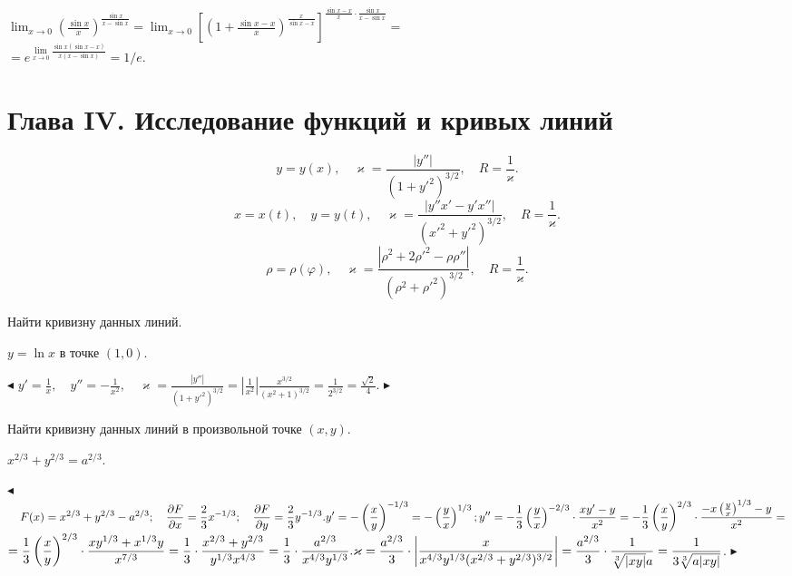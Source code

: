 \documentclass[a5paper,10pt]{article}
\begin{document}
 $\displaystyle\lim_{x\to 0}
\left(\frac{\sin x}{x}\right)^{\frac{\sin x}{x-\sin x}}=
\lim_{x\to 0}\left[\left(1+\frac{\sin x-x}{x}\right)^{\frac{x}{\sin x-x}}\right]^
{\frac{\sin x-x}{x}\cdot\frac{\sin x}{x-\sin x}}=$\\
$\displaystyle=e^{\lim\limits_{x\to 0}\frac{\sin x(\sin x-x)}{x(x-\sin x)}}=1/e$.

\bigskip
\section* {Глава IV. Исследование функций и кривых линий}

\medskip
{}

$$y=y(x),\quad\varkappa=\frac{|y''|}{(1+y'^2)^{3/2}},\quad R=\frac{1}{\varkappa}.$$
$$x=x(t),\quad y=y(t),\quad \varkappa=\frac{|y''x'-y'x''|}{(x'^2+y'^2)^{3/2}},\quad R=\frac{1}{\varkappa}.$$
$$\rho=\rho(\varphi),\quad\varkappa=\frac{|\rho^2+2\rho'^2-\rho\rho''|}{(\rho^2+\rho'^2)^{3/2}},\quad R=\frac{1}{\varkappa}.$$

\medskip
\noindent Найти кривизну данных линий.

\medskip
{} $y=\ln x$ в точке $(1,0)$.

\smallskip
\noindent $\blacktriangleleft$
$\displaystyle y'=\frac 1x,\quad y''=-\frac{1}{x^2},\quad
\varkappa=\frac{|y''|}{(1+y'^2)^{3/2}}=
\left|\frac{1}{x^2}\right|\frac{x^{3/2}}{(x^2+1)^{3/2}}=
\frac{1}{2^{3/2}}=\frac{\sqrt2}{4}$.
$\blacktriangleright$

\medskip
\noindent Найти кривизну данных линий в произвольной точке $(x,y)$.

\medskip
{} $x^{2/3}+y^{2/3}=a^{2/3}$.

\smallskip
\noindent $\blacktriangleleft$
$\displaystyle \quad F(x)=x^{2/3}+y^{2/3}-a^{2/3};\quad
\frac{\partial F}{\partial x}=\frac23x^{-1/3};\quad
\frac{\partial F}{\partial y}=\frac23y^{-1/3}.\\
y'=-\left(\frac xy\right)^{-1/3}=-\left(\frac yx\right)^{1/3};\\
y''=-\frac13\left(\frac yx\right)^{-2/3}\cdot\frac{xy'-y}{x^2}=
-\frac13\left(\frac xy\right)^{2/3}\cdot\frac{-x\left(\frac yx\right)^{1/3}-y}{x^2}=$\\
$\displaystyle =\frac13\left(\frac xy\right)^{2/3}\cdot\frac{xy^{1/3}+x^{1/3}y}{x^{7/3}}=
\frac13\cdot\frac{x^{2/3}+y^{2/3}}{y^{1/3}x^{4/3}}=
\frac13\cdot\frac{a^{2/3}}{x^{4/3}y^{1/3}}.\\
\varkappa=\frac{a^{2/3}}{3}\cdot\left|\frac{x}{x^{4/3}y^{1/3}(x^{2/3}+y^{2/3})^{3/2}}\right|=
\frac{a^{2/3}}{3}\cdot\frac{1}{\sqrt[3]{|xy|}a}=
\frac{1}{3\sqrt[3]{a|xy|}}$.
$\blacktriangleright$
\end{document}
